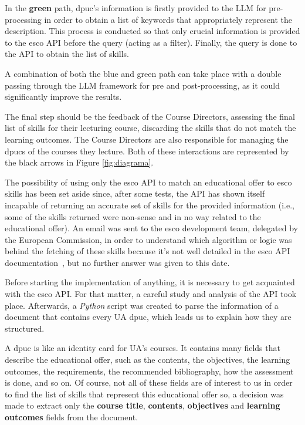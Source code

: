 In the \textbf{green} path, \ac{dpuc}’s information is firstly provided to the LLM for pre-processing in order to obtain a list of keywords that appropriately represent the description. This process is conducted so that only crucial information is provided to the \ac{esco} API before the query (acting as a filter). Finally, the query is done to the API to obtain the list of skills.

A combination of both the blue and green path can take place with a double passing through the LLM framework for pre and post-processing, as it could significantly improve the results.

The final step should be the feedback of the Course Directors, assessing the final list of skills for their lecturing course, discarding the skills that do not match the learning outcomes. The Course Directors are also responsible for managing the \ac{dpuc}s of the courses they lecture. Both of these interactions are represented by the black arrows in Figure \ref{fig:diagrama}.

The possibility of using only the \ac{esco} API to match an educational offer to \ac{esco} skills has been set aside since, after some tests, the API has shown itself incapable of returning an accurate set of skills for the provided information (i.e., some of the skills returned were non-sense and in no way related to the educational offer). An email was sent to the \ac{esco} development team, delegated by the European Commission, in order to understand which algorithm or logic was behind the fetching of these skills because it’s not well detailed in the \ac{esco} API documentation~\cite{esco_api_doc}, but no further answer was given to this date.

Before starting the implementation of anything, it is necessary to get acquainted with the \ac{esco} API. For that matter, a careful study and analysis of the API took place.
Afterwards, a \textit{Python} script was created to parse the information of a document that contains every UA \ac{dpuc}, which leads us to explain how they are structured.

A \ac{dpuc} is like an identity card for UA’s courses. It contains many fields that describe the educational offer, such as the contents, the objectives, the learning outcomes, the requirements, the recommended bibliography, how the assessment is done, and so on. Of course, not all of these fields are of interest to us in order to find the list of skills that represent this educational offer so, a decision was made to extract only the \textbf{course title}, \textbf{contents}, \textbf{objectives} and \textbf{learning outcomes} fields from the document.

